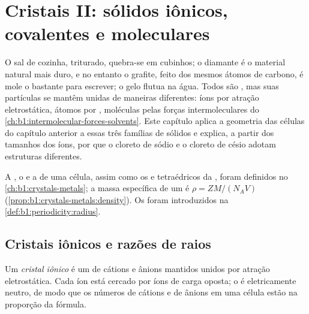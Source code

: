 \chapter{Cristais II: sólidos iônicos, covalentes e moleculares}\label{ch:b1:crystals-ionic-covalent}

O sal de cozinha, triturado, quebra-se em cubinhos; o diamante é o
material natural mais duro, e no entanto o grafite, feito dos mesmos
átomos de carbono, é mole o bastante para escrever; o gelo flutua na
água. Todos são , mas suas partículas se mantêm unidas de
maneiras diferentes: íons por atração eletrostática, átomos por , moléculas pelas forças intermoleculares do
\cref{ch:b1:intermolecular-forces-solvents}. Este capítulo aplica a
geometria das células do capítulo anterior a essas três famílias de
sólidos e explica, a partir dos tamanhos dos íons, por que o cloreto de
sódio e o cloreto de césio adotam estruturas diferentes.

\begin{recall}
A , o  e a  de uma célula,
assim como os  e tetraédricos da  , foram definidos no \cref{ch:b1:crystals-metals}; a massa
específica de um  é $\rho = ZM/(N_A V)$
(\cref{prop:b1:crystals-metals:density}). Os  foram
introduzidos na \cref{def:b1:periodicity:radius}.
\end{recall}

\section{Cristais iônicos e razões de raios}

\begin{definition}\label{def:b1:crystals-ionic-covalent:ionic-crystal}
Um \emph{cristal iônico} é um  de cátions e
ânions mantidos unidos por atração eletrostática. Cada íon está cercado
por íons de carga oposta; o  é eletricamente neutro, de modo que
os números de cátions e de ânions em uma célula estão na proporção da
fórmula.
\end{definition}

